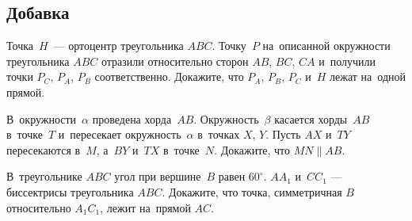 
\subsection*{Добавка}



\begin{problems}

\item
Точка~$H$~--- ортоцентр треугольника $ABC$.
Точку~$P$ на~описанной окружности треугольника $ABC$ отразили относительно
сторон $AB$, $BC$, $CA$ и~получили точки $P_C$, $P_A$, $P_B$ соответственно.
Докажите, что $P_A$, $P_B$, $P_C$ и~$H$ лежат на~одной прямой.

\item
В~окружности~$\alpha$ проведена хорда~$AB$.
Окружность~$\beta$ касается хорды~$AB$ в~точке~$T$ и~пересекает
окружность~$\alpha$ в~точках $X$, $Y$.
Пусть $AX$ и~$TY$ пересекаются в~$M$, а~$BY$ и~$TX$ в~точке~$N$.
Докажите, что $MN \parallel AB$.

\item
В~треугольнике $ABC$ угол при вершине~$B$ равен $60^{\circ}$.
$A A_1$ и~$C C_1$ — биссектрисы треугольника $ABC$.
Докажите, что точка, симметричная $B$ относительно $A_1 C_1$, лежит
на~прямой $AC$.

\end{problems}

